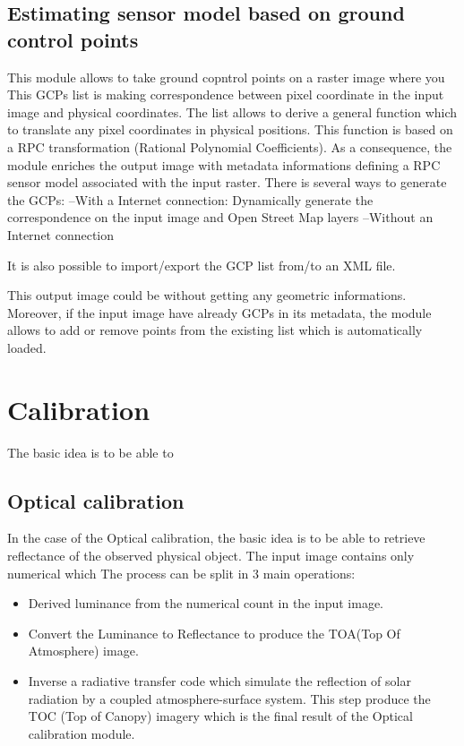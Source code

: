 \documentclass{InsightSoftwareGuide}
\begin{document}
\subsection{Estimating sensor model based on ground control points}
This module allows to take ground copntrol points on a raster image where you 
This GCPs list is making correspondence between pixel coordinate in the input image and physical coordinates. The list
allows to derive a general function which to translate any pixel coordinates in physical positions. This function is 
based on a RPC transformation (Rational Polynomial Coefficients). As a consequence, the module enriches the output image 
with metadata informations defining a RPC sensor model associated with the input raster. 
There is several ways to generate the GCPs:
--With a Internet connection: Dynamically generate the correspondence on the input image and Open Street Map layers
--Without an  Internet connection

It is also possible to import/export the GCP list from/to an XML file.

This output image could be without getting any geometric informations. Moreover, if the input image have already GCPs
in its metadata, the module allows to add or remove points from the existing list which is automatically loaded.       

\section{Calibration}
The basic idea is to be able to  
\subsection{Optical calibration}
In the case of the Optical calibration, the basic idea is to be able to retrieve reflectance of the observed physical object.
The input image contains only numerical which 
The process can be split in 3 main operations:
\begin{itemize}
\item Derived luminance from the numerical count in the input image. 
\item Convert the Luminance to Reflectance to produce the TOA(Top Of Atmosphere) image.
\item Inverse a radiative transfer code which simulate the reflection of solar radiation by a coupled atmosphere-surface system. This step produce 
the TOC (Top of Canopy) imagery which is the final result of the Optical calibration module. 
\end{itemize}
    
\end{document}
